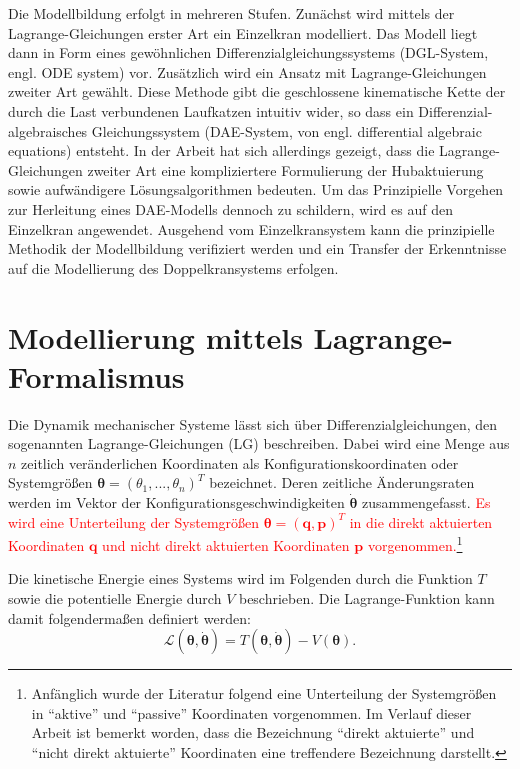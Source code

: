 Die Modellbildung erfolgt in mehreren Stufen. Zunächst wird mittels der Lagrange-Gleichungen erster Art ein Einzelkran modelliert. Das Modell liegt dann in Form eines gewöhnlichen Differenzialgleichungssystems (DGL-System, engl. ODE system) vor. Zusätzlich wird ein Ansatz mit Lagrange-Gleichungen zweiter Art gewählt. Diese Methode gibt die geschlossene kinematische Kette der durch die Last verbundenen Laufkatzen intuitiv wider, so dass ein Differenzial-algebraisches Gleichungssystem (DAE-System, von engl. differential algebraic equations) entsteht. In der Arbeit hat sich allerdings gezeigt, dass die Lagrange-Gleichungen zweiter Art eine kompliziertere Formulierung der Hubaktuierung sowie aufwändigere Lösungsalgorithmen bedeuten. Um das Prinzipielle Vorgehen zur Herleitung eines DAE-Modells dennoch zu schildern, wird es auf den Einzelkran angewendet. Ausgehend vom Einzelkransystem kann die prinzipielle Methodik der Modellbildung verifiziert werden und ein Transfer der Erkenntnisse auf die Modellierung des Doppelkransystems erfolgen.

\section{Modellierung mittels Lagrange-Formalismus}
Die Dynamik mechanischer Systeme lässt sich über Differenzialgleichungen, den sogenannten Lagrange-Gleichungen (LG) beschreiben. Dabei wird eine Menge aus $n$ zeitlich veränderlichen Koordinaten als Konfigurationskoordinaten oder Systemgrößen $\boldsymbol{\theta} = (\theta_1, ..., \theta_n)^T$ bezeichnet. Deren zeitliche Änderungsraten werden im Vektor der Konfigurationsgeschwindigkeiten $\dot{\boldsymbol{\theta}}$ zusammengefasst. \textcolor{red}{Es wird eine Unterteilung der Systemgrößen $\boldsymbol{\theta} = (\mathbf{q}, \mathbf{p})^T$ in die direkt aktuierten Koordinaten $\mathbf{q}$ und nicht direkt aktuierten Koordinaten $\mathbf{p}$ vorgenommen.\footnote{Anfänglich wurde der Literatur \cite[S.10]{DissKnoll} folgend eine Unterteilung der Systemgrößen in ``aktive'' und ``passive'' Koordinaten vorgenommen. Im Verlauf dieser Arbeit ist bemerkt worden, dass die Bezeichnung ``direkt aktuierte'' und ``nicht direkt aktuierte'' Koordinaten eine treffendere Bezeichnung darstellt.}} \cite[S.7]{DissKnoll} 

Die kinetische Energie eines Systems wird im Folgenden durch die Funktion $T$ sowie die potentielle Energie durch $V$ beschrieben. Die Lagrange-Funktion kann damit folgendermaßen definiert werden:
\begin{equation}
\mathcal{L}(\boldsymbol{\theta}, \dot{\boldsymbol{\theta}}) = T(\boldsymbol{\theta}, \dot{\boldsymbol{\theta}}) - V(\boldsymbol{\theta}).
\end{equation}

